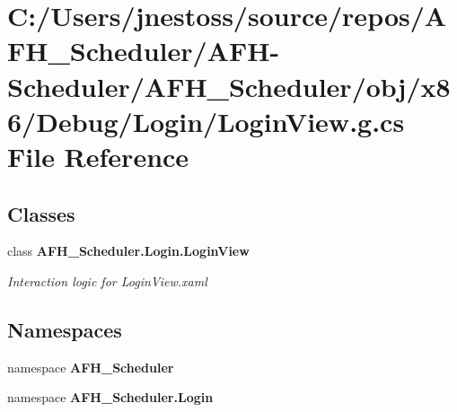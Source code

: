\section{C\+:/\+Users/jnestoss/source/repos/\+A\+F\+H\+\_\+\+Scheduler/\+A\+F\+H-\/\+Scheduler/\+A\+F\+H\+\_\+\+Scheduler/obj/x86/\+Debug/\+Login/\+Login\+View.g.\+cs File Reference}
\label{x86_2_debug_2_login_2_login_view_8g_8cs}
\subsection*{Classes}
\begin{DoxyCompactItemize}
\item 
class \textbf{ A\+F\+H\+\_\+\+Scheduler.\+Login.\+Login\+View}
\begin{DoxyCompactList}\small\item\em Interaction logic for Login\+View.\+xaml \end{DoxyCompactList}\end{DoxyCompactItemize}
\subsection*{Namespaces}
\begin{DoxyCompactItemize}
\item 
namespace \textbf{ A\+F\+H\+\_\+\+Scheduler}
\item 
namespace \textbf{ A\+F\+H\+\_\+\+Scheduler.\+Login}
\end{DoxyCompactItemize}

